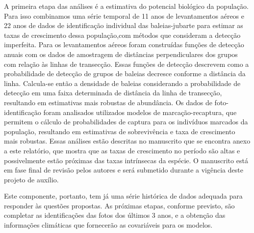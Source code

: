 A primeira etapa das análises é a estimativa do potencial biológico da população.
Para isso combinamos uma série temporal de 11 anos de levantamentos aéreos e 22
anos de dados de identificação individual das baleias-jubarte 
para estimar as taxas de crescimento dessa população,com métodos que consideram a
detecção imperfeita. Para os levantamentos aéreos
foram construídas funções de detecção anuais com os dados de
amostragem de distâncias perpendiculares dos grupos com relação às
linhas de transecção. Essas funções de detecção descrevem como a
probabilidade de detecção de grupos de baleias decresce conforme a
distância da linha. Calcula-se então a densidade de baleias
considerando a probabilidade de detecção em uma faixa determinada de
distância da linha de transecção, resultando em estimativas mais
robustas de abundância. Os dados de foto-identificação foram
analisados utilizados modelos de marcação-recaptura, que permitem o
cálculo de probabilidades de captura para os indivíduos marcados da
população, resultando em estimativas de sobrevivência e taxa de
crescimento mais robustas. Essas análises estão descritas no
manuscrito que se encontra anexo a este relatório, que mostra que
as taxas de crescimento no período são altas e possivelmente estão próximas
das taxas intrínsecas da espécie. O manuscrito está
em fase final de revisão pelos autores e será submetido durante a
vigência deste projeto de auxílio.

Este componente, portanto, tem já uma série histórica de dados adequada
para responder às questões propostas. As próximas etapas, conforme previsto,
são completar as identificações das fotos dos últimos 3 anos, 
e a obtenção das informações climáticas 
que fornecerão as covariáveis para os modelos.